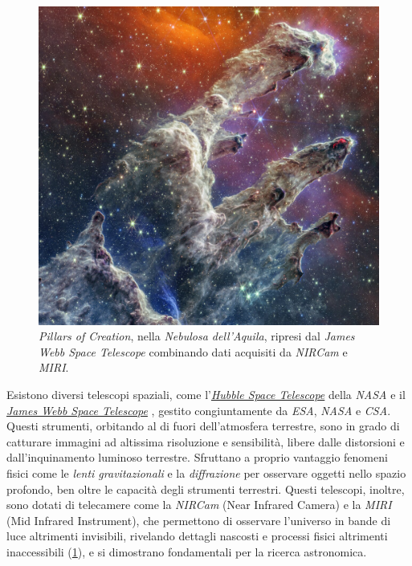 \begin{figure}[h]
    \centering
    \includegraphics[scale = 0.6]{../assets/Webb_POC.jpg}
    \captionsetup{justification=centering}
    \caption{\textit{Pillars of Creation}, nella \textit{Nebulosa dell'Aquila}, ripresi dal \textit{James Webb Space Telescope} combinando dati acquisiti da \textit{NIRCam} e \textit{MIRI}.} \label{fig:webb_poc}
\end{figure}

Esistono diversi telescopi spaziali, come l'\textit{\href{https://hubblesite.org/home}{Hubble Space Telescope}} \cite{hubble} della \textit{NASA} e il \textit{\href{https://webbtelescope.org/home}{James Webb Space Telescope}} \cite{jwst}, gestito congiuntamente da \textit{ESA}, \textit{NASA} e \textit{CSA}. Questi strumenti, orbitando al di fuori dell'atmosfera terrestre, sono in grado di catturare immagini ad altissima risoluzione e sensibilità, libere dalle distorsioni e dall'inquinamento luminoso terrestre. Sfruttano a proprio vantaggio fenomeni fisici come le \textit{lenti gravitazionali} e la \textit{diffrazione} per osservare oggetti nello spazio profondo, ben oltre le capacità degli strumenti terrestri. Questi telescopi, inoltre, sono dotati di telecamere come la \textit{NIRCam} (Near Infrared Camera) e la \textit{MIRI} (Mid Infrared Instrument), che permettono di osservare l'universo in bande di luce altrimenti invisibili, rivelando dettagli nascosti e processi fisici altrimenti inaccessibili (\cref{fig:webb_poc}), e si dimostrano fondamentali per la ricerca astronomica.

